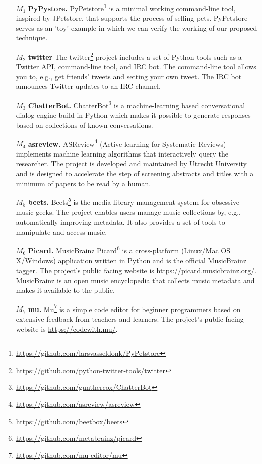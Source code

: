 \begin{enumerate}
    \item[$M_1$]\textbf{PyPystore.} PyPetstore\footnote{\href{https://github.com/larsvasseldonk/PyPetstore}{https://github.com/larsvasseldonk/PyPetstore}} is a minimal working command-line tool, inspired by JPetstore, that supports the process of selling pets. PyPetstore serves as an 'toy' example in which we can verify the working of our proposed technique.
    \item[$M_2$] \textbf{twitter} The twitter\footnote{\href{https://github.com/python-twitter-tools/twitter}{https://github.com/python-twitter-tools/twitter}} project includes a set of Python tools such as a Twitter API, command-line tool, and IRC bot. The command-line tool allows you to, e.g., get friends' tweets and setting your own tweet. The IRC bot announces Twitter updates to an IRC channel. 
    \item[$M_3$] \textbf{ChatterBot.} ChatterBot\footnote{\href{https://github.com/gunthercox/ChatterBot}{https://github.com/gunthercox/ChatterBot}} is a machine-learning based conversational dialog engine build in Python which makes it possible to generate responses based on collections of known conversations.
    \item[$M_4$] \textbf{asreview.} ASReview\footnote{\href{https://github.com/asreview/asreview}{https://github.com/asreview/asreview}} (Active learning for Systematic Reviews) implements machine learning algorithms that interactively query the researcher. The project is developed and maintained by Utrecht University and is designed to accelerate the step of screening abstracts and titles with a minimum of papers to be read by a human.
    \item[$M_5$] \textbf{beets.} Beets\footnote{\href{https://github.com/beetbox/beets}{https://github.com/beetbox/beets}} is the media library management system for obsessive music geeks. The project enables users manage music collections by, e.g., automatically improving metadata. It also provides a set of tools to manipulate and access music.
    \item[$M_6$] \textbf{Picard.} MusicBrainz Picard\footnote{\href{https://github.com/metabrainz/picard}{https://github.com/metabrainz/picard}} is a cross-platform (Linux/Mac OS X/Windows) application written in Python and is the official MusicBrainz tagger. The project's public facing website is \href{https://picard.musicbrainz.org/}{https://picard.musicbrainz.org/}. MusicBrainz is an open music encyclopedia that collects music metadata and makes it available to the public.
    \item[$M_7$] \textbf{mu.} Mu\footnote{\href{https://github.com/mu-editor/mu}{https://github.com/mu-editor/mu}} is a simple code editor for beginner programmers based on extensive feedback from teachers and learners. The project's public facing website is \href{https://codewith.mu/}{https://codewith.mu/}.
\end{enumerate}


